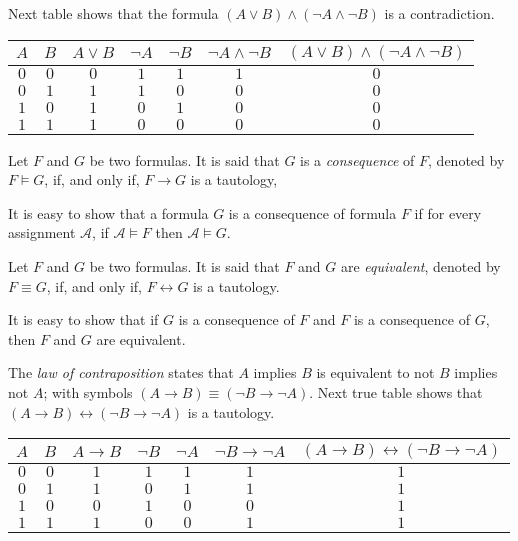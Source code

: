 \begin{example}
Next table shows that the formula $(A \lor B) \land (\lnot A \land \lnot B)$ is a contradiction.
\begin{center}
\begin{tabular}{ c | c | c | c | c | c | c}
 $A$ & $B$ & $A \lor B$ & $\lnot A$ & $\lnot B$ & $\lnot A \land \lnot B$ & $(A \lor B) \land (\lnot A \land \lnot B)$ \\
 \hline
 $0$ & $0$ & $0$ & $1$ & $1$ & $1$ & $0$ \\
 $0$ & $1$ & $1$ & $1$ & $0$ & $0$ & $0$ \\
 $1$ & $0$ & $1$ & $0$ & $1$ & $0$ & $0$ \\
 $1$ & $1$ & $1$ & $0$ & $0$ & $0$ & $0$
\end{tabular}
\end{center}
\end{example}

\begin{definition}
Let $F$ and $G$ be two formulas. It is said that $G$ is a \emph{consequence} of $F$, denoted by $F \models G$, if, and only if, $F \rightarrow G$ is a tautology, 
\end{definition}

It is easy to show that a formula $G$ is a consequence of formula $F$ if for every assignment $\mathcal{A}$, if $\mathcal{A} \models F$ then $\mathcal{A} \models G$.

\begin{definition}
Let $F$ and $G$ be two formulas. It is said that $F$ and $G$ are \emph{equivalent}, denoted by $F \equiv G$, if, and only if, $F \leftrightarrow G$ is a tautology.
\end{definition}

It is easy to show that if $G$ is a consequence of $F$ and $F$ is a consequence of $G$, then $F$ and $G$ are equivalent.

\begin{example}
The \emph{law of contraposition} states that $A$ implies $B$ is equivalent to not $B$ implies not $A$; with symbols $( A \rightarrow B ) \equiv ( \lnot B \rightarrow \lnot A )$. Next true table shows that $( A \rightarrow B ) \leftrightarrow ( \lnot B \rightarrow \lnot A )$ is a tautology.
\begin{center}
\begin{tabular}{ c | c | c | c | c | c | c}
 $A$ & $B$ & $A \rightarrow B$ & $\lnot B$ & $\lnot A$ & $\lnot B \rightarrow \lnot A$ & $(A \rightarrow B) \leftrightarrow (\lnot B \rightarrow \lnot A)$ \\
 \hline
 $0$ & $0$ & $1$ & $1$ & $1$ & $1$ & $1$ \\
 $0$ & $1$ & $1$ & $0$ & $1$ & $1$ & $1$ \\
 $1$ & $0$ & $0$ & $1$ & $0$ & $0$ & $1$ \\
 $1$ & $1$ & $1$ & $0$ & $0$ & $1$ & $1$
\end{tabular}
\end{center}
\end{example}

